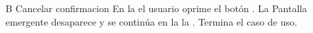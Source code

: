 	\begin{UCtrayectoriaA}{B} {Cancelar confirmacion}
		\UCpaso[\UCactor] En la  el usuario oprime el botón        .
		\UCpaso La Pantalla emergente desaparece y se continúa en la la . 
		\UCpaso Termina el caso de uso.
	\end{UCtrayectoriaA}

